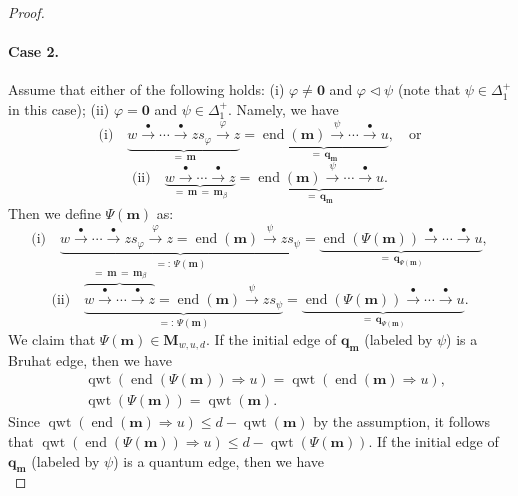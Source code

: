 \documentclass[11pt,a4paper,reqno,dvipdfmx]{amsart}
\numberwithin{equation}{section}
\newcommand{\vp}{\varphi}
\newcommand{\bm}{\mathbf{m}}
\newcommand{\bq}{\mathbf{q}}
\newcommand{\bM}{\mathbf{M}}
\newcommand{\bzero}{\mathbf{0}}
\DeclareMathOperator{\qwt}{qwt}
\DeclareMathOperator{\ed}{end}
\newcommand{\edge}[1]{ \xrightarrow{\hspace{2pt}#1\hspace{2pt}} }
\theoremstyle{plain}
\theoremstyle{definition}
\theoremstyle{remark}
\begin{document}
\begin{proof}
\paragraph{\bf Case 2.}
%
Assume that either of the following holds: 
(i) $\vp \ne \bzero$ and $\vp \lhd \psi$ (note that $\psi \in \Delta_{1}^{+}$ 
in this case); (ii) $\vp = \bzero$ and $\psi \in \Delta_{1}^{+}$. Namely, we have 
%
\begin{equation*}
\text{(i)} \quad
\underbrace{w \edge{\bullet} \cdots \edge{\bullet} zs_{\vp} \edge{\vp} z}_{= \, \bm} = 
\underbrace{\ed(\bm) \edge{\psi} \cdots \edge{\bullet} u}_{= \, \bq_{\bm}}, \quad \text{or} 
\end{equation*}
%
\begin{equation*}
\text{(ii)} \quad 
\underbrace{w \edge{\bullet} \cdots \edge{\bullet} z}_{= \, \bm \, = \, \bm_{\beta}} = 
\underbrace{\ed(\bm) \edge{\psi} \cdots \edge{\bullet} u}_{= \, \bq_{\bm}}.  
\end{equation*}
%
Then we define $\Psi(\bm)$ as: 
%
\begin{equation*}
\text{(i)} \quad
\underbrace{w \edge{\bullet} \cdots \edge{\bullet} zs_{\vp} \edge{\vp} z = \ed(\bm) 
\edge{\psi} zs_{\psi}}_{=: \, \Psi(\bm)} = 
\underbrace{\ed(\Psi(\bm)) \edge{\bullet} \cdots \edge{\bullet} u}_{= \, \bq_{\Psi(\bm)}},  
\end{equation*}
%
\begin{equation*}
\text{(ii)} \quad 
\underbrace{\overbrace{ w \edge{\bullet} \cdots \edge{\bullet} z}^{= \, \bm \, = \, \bm_{\beta}} = \ed(\bm) 
\edge{\psi} zs_{\psi}}_{=: \, \Psi(\bm)} = 
\underbrace{\ed(\Psi(\bm)) \edge{\bullet} \cdots \edge{\bullet} u}_{= \, \bq_{\Psi(\bm)}}. 
\end{equation*}
%
We claim that $\Psi(\bm) \in \bM_{w,u,d}$. 
If the initial edge of $\bq_{\bm}$ (labeled by $\psi$) is a Bruhat edge, then we have
%
\begin{equation} \label{eq:case2a}
%
\begin{split}
& \qwt(\ed(\Psi(\bm)) \Rightarrow u) = \qwt(\ed(\bm) \Rightarrow u), \\
& \qwt(\Psi(\bm)) = \qwt(\bm).
\end{split}
%
\end{equation}
%
Since $\qwt(\ed(\bm) \Rightarrow u) \le d - \qwt(\bm)$ by the assumption, 
it follows that $\qwt(\ed(\Psi(\bm)) \Rightarrow u) \le d - \qwt(\Psi(\bm))$. 
If the initial edge of $\bq_{\bm}$ (labeled by $\psi$) is 
a quantum edge, then we have
%
\begin{equation} \label{eq:case2b}

\end{equation}
\end{proof}
\end{document}
